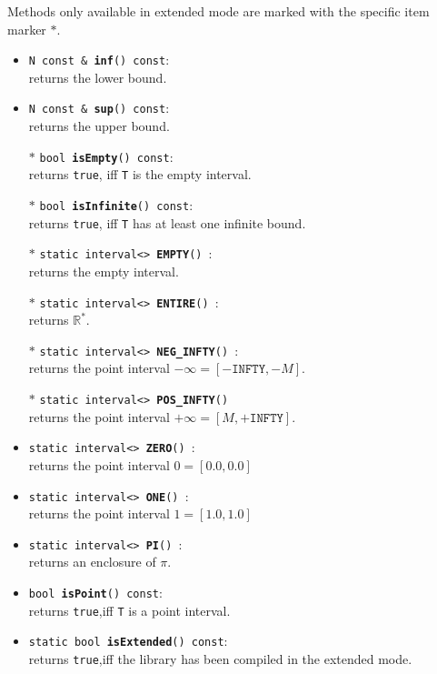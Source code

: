 \documentclass{report}
\newcommand{\Rs}{\mathbb{R}^*}
\newcommand{\INFTY}{\texttt{INFTY}}
\begin{document}
Methods only available in extended mode are marked with the specific
		item marker $\ast$.
		\begin{itemize}
			\item \texttt{N const \& {\bf inf}() const}:\\
		returns the lower bound.
			\item \texttt{N const \& {\bf sup}() const}:\\
		returns the upper bound.
			\item[$\ast$] \texttt{bool {\bf isEmpty}() const}:\\
				returns \texttt{true}, iff \texttt{T}
		is the empty interval.
			\item[$\ast$] \texttt{bool {\bf isInfinite}() const}:\\
				returns \texttt{true}, iff \texttt{T}
				has at least one infinite bound.
			\item[$\ast$] \texttt{static interval<> {\bf EMPTY}() }:\\
				returns the empty interval.
			\item[$\ast$] \texttt{static interval<> {\bf ENTIRE}() }:\\
				returns $\Rs$.
			\item[$\ast$] \texttt{static interval<> {\bf NEG\_INFTY}() }:\\
				returns the point interval $-\infty =
		[-\INFTY, -M]$.
			\item[$\ast$] \texttt{static interval<> {\bf POS\_INFTY}() }\\returns the point interval $+\infty =
		[M,+\INFTY]$.
				
			\item \texttt{static interval<> {\bf ZERO}() }:\\
				returns the point interval $0 = [0.0, 0.0]$
			\item \texttt{static interval<> {\bf ONE}()
				}:\\
	returns the point interval $1 = [1.0, 1.0]$
				
			\item \texttt{static interval<> {\bf PI}() }:\\
				returns an enclosure of  $\pi$.

			\item \texttt{bool {\bf isPoint}() const}:\\
				returns \texttt{true},iff
				\texttt{T} is a point interval.
			\item \texttt{static bool {\bf isExtended}() const}:\\
				returns \texttt{true},iff the library
				has been compiled in the extended mode.


\end{itemize}
\end{document}
